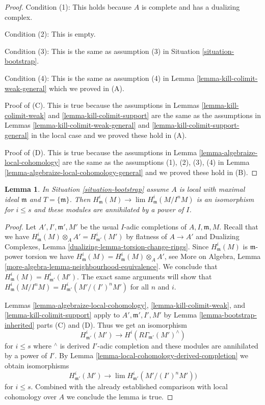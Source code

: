 \documentclass{stacks-project}
\theoremstyle{plain}
\newtheorem{lemma}[subsection]{Lemma}
\theoremstyle{definition}
\theoremstyle{remark}
\numberwithin{equation}{subsection}
\def\lim{\mathop{\mathrm{lim}}\nolimits}
\begin{document}
\begin{proof}
\medskip\noindent
Condition (1): This holds because $A$ is complete and has a dualizing complex.

\medskip\noindent
Condition (2): This is empty.

\medskip\noindent
Condition (3): This is the same as assumption (3) in
Situation \ref{situation-bootstrap}.

\medskip\noindent
Condition (4): This is the same as assumption (4) in
Lemma \ref{lemma-kill-colimit-weak-general} which we proved in (A).

\medskip\noindent
Proof of (C). This is true because the assumptions in
Lemmas \ref{lemma-kill-colimit-weak} and \ref{lemma-kill-colimit-support}
are the same as the assumptions in
Lemmas \ref{lemma-kill-colimit-weak-general} and
\ref{lemma-kill-colimit-support-general} in the local case
and we proved these hold in (A).

\medskip\noindent
Proof of (D). This is true because the assumptions in
Lemma \ref{lemma-algebraize-local-cohomology}
are the same as the assumptions (1), (2), (3), (4) in
Lemma \ref{lemma-algebraize-local-cohomology-general}
and we proved these hold in (B).
\end{proof}

\begin{lemma}
\label{lemma-algebraize-local-cohomology-bis}
In Situation \ref{situation-bootstrap} assume $A$ is local with
maximal ideal $\mathfrak m$ and $T = \{\mathfrak m\}$. Then
$H^i_\mathfrak m(M) \to \lim H^i_\mathfrak m(M/I^nM)$
is an isomorphism for $i \leq s$ and these modules are
annihilated by a power of $I$.
\end{lemma}

\begin{proof}
Let $A', I', \mathfrak m', M'$ be the usual $I$-adic completions
of $A, I, \mathfrak m, M$. Recall that we have
$H^i_\mathfrak m(M) \otimes_A A' = H^i_{\mathfrak m'}(M')$
by flatness of $A \to A'$ and Dualizing Complexes, Lemma
\ref{dualizing-lemma-torsion-change-rings}.
Since $H^i_\mathfrak m(M)$ is $\mathfrak m$-power torsion we have
$H^i_\mathfrak m(M) = H^i_\mathfrak m(M) \otimes_A A'$, see
More on Algebra, Lemma \ref{more-algebra-lemma-neighbourhood-equivalence}.
We conclude that $H^i_\mathfrak m(M) = H^i_{\mathfrak m'}(M')$.
The exact same arguments will show that
$H^i_\mathfrak m(M/I^nM) =  H^i_{\mathfrak m'}(M'/(I')^nM')$
for all $n$ and $i$.

\medskip\noindent
Lemmas \ref{lemma-algebraize-local-cohomology},
\ref{lemma-kill-colimit-weak}, and
\ref{lemma-kill-colimit-support}
apply to $A', \mathfrak m', I', M'$ by
Lemma \ref{lemma-bootstrap-inherited} parts (C) and (D).
Thus we get an isomorphism
$$
H^i_{\mathfrak m'}(M') \longrightarrow H^i(R\Gamma_{\mathfrak m'}(M')^\wedge)
$$
for $i \leq s$ where ${}^\wedge$ is derived $I'$-adic completion and these
modules are annihilated by a power of $I'$.
By Lemma \ref{lemma-local-cohomology-derived-completion}
we obtain isomorphisms
$$
H^i_{\mathfrak m'}(M') \longrightarrow
\lim H^i_{\mathfrak m'}(M'/(I')^nM'))
$$
for $i \leq s$. Combined with the already established comparison
with local cohomology over $A$ we conclude the lemma is true.
\end{proof}
\end{document}
